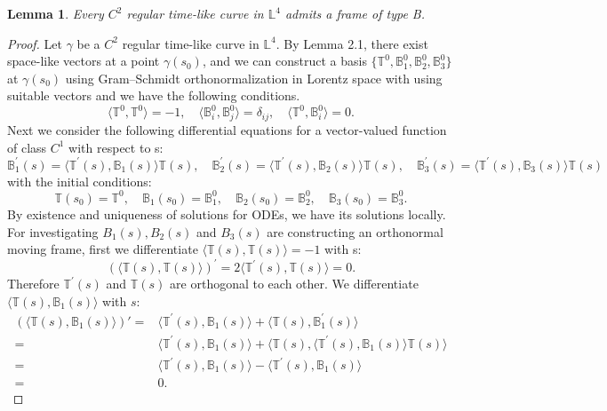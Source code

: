 \documentclass[a4paper]{amsart}
\newtheorem{lemma}[theorem]{Lemma}
\theoremstyle{definition}
\theoremstyle{remark}
\newcommand{\LL}{\mathbb{L}}
\numberwithin{equation}{section}
\begin{document}
\begin{lemma}\label{lemma:0}
Every $C^{2}$ regular time-like curve in $\LL^{4}$ admits a frame of type B. 
\end{lemma}
\begin{proof}
Let $\gamma$ be a $C^{2}$ regular time-like curve in $\mathbb{L}^4$. By Lemma 2.1, there exist space-like vectors at a point $\gamma(s_0)$, and we can construct a basis $\{\mathbb{T}^0, \mathbb{B}_1^0, \mathbb{B}_2^0, \mathbb{B}_3^0\}$ at $\gamma(s_0)$ using Gram–Schmidt orthonormalization in Lorentz space with using suitable vectors and we have the following conditions. \[\langle\mathbb{T}^0, \mathbb{T}^0\rangle=-1,\quad \langle\mathbb{B}^{0}_i, \mathbb{B}^{0}_{j}\rangle=\delta_{ij} ,\quad \langle\mathbb{T}^0, \mathbb{B}^{0}_{i}\rangle=0.\] Next we consider the following differential equations for a vector-valued function of 
class $C^{1}$ with respect to s:
\[
\mathbb{B}_1^{'}(s) = \langle\mathbb{T}^{\prime}(s), \mathbb{B}_{1}(s)\rangle\mathbb{T}(s), \quad \mathbb{B}_2^{'}(s) = \langle\mathbb{T}^{\prime}(s), \mathbb{B}_{2}(s)\rangle\mathbb{T}(s), \quad \mathbb{B}_3^{'}(s) = \langle\mathbb{T}^{\prime}(s), \mathbb{B}_{3}(s)\rangle\mathbb{T}(s)
\]
with the initial conditions:
\[
\mathbb{T}(s_0) = \mathbb{T}^0, \quad \mathbb{B}_1(s_0) = \mathbb{B}_1^0, \quad \mathbb{B}_2(s_0) = \mathbb{B}_2^0, \quad \mathbb{B}_3(s_0) = \mathbb{B}_3^0
.\]
By existence and uniqueness of solutions for ODEs, we have its solutions locally.
For investigating $B_{1}(s), B_{2}(s)$ and $B_{3}(s)$ are constructing an orthonormal moving frame, 
first we differentiate $\langle\mathbb{T}(s), \mathbb{T}
(s)\rangle=-1$ with s:
\[
(\langle\mathbb{T}(s), \mathbb{T}
(s)\rangle)^{\prime}=2\langle\mathbb{T}^{\prime}(s), \mathbb{T}(s)\rangle=0    
.\]
Therefore $\mathbb{T}^{\prime}(s)$ and $\mathbb{T}(s)$ are orthogonal to each other.
We differentiate $\langle \mathbb{T}(s),\mathbb{B}_1(s)\rangle$ with $s$:
\begin{align*}
\left( \langle \mathbb{T}(s), \mathbb{B}_1(s) \rangle \right)' 
= &\langle\mathbb{T}^{\prime}(s), \mathbb{B}_{1}(s)\rangle+\langle\mathbb{T}(s), \mathbb{B}_{1}^{\prime}(s)\rangle\\
=&\langle\mathbb{T}^{\prime}(s), \mathbb{B}_{1}(s)\rangle+\langle\mathbb{T}(s), \langle\mathbb{T}^{\prime}(s), \mathbb{B}_{1}(s)\rangle\mathbb{T}(s)\rangle\\
=&\langle\mathbb{T}^{\prime}(s), \mathbb{B}_{1}(s)\rangle- \langle\mathbb{T}^{\prime}(s), \mathbb{B}_{1}(s)\rangle\\
=&0
.\end{align*}

\end{proof}
\end{document}
